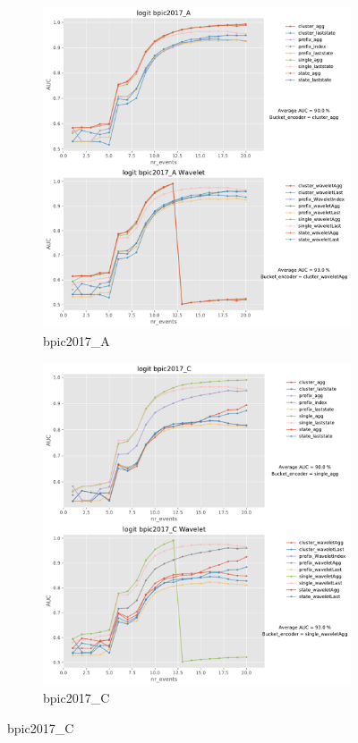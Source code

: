 \documentclass[twoside,11pt]{Latex/Classes/PhDthesisPSnPDF}
\begin{document}
\begin{figure}[!htbp] %
	
	\begin{subfigure}{0.48\textwidth}
		\includegraphics[width=\linewidth]{images/wavelet/graphs2logit/bpic2017_A.pdf}
		\caption{bpic2017\_A} 
	\end{subfigure}\hspace*{\fill}
	\begin{subfigure}{0.48\textwidth}
		\includegraphics[width=\linewidth]{images/wavelet/graphs2logit/bpic2017_C.pdf}
		\caption{bpic2017\_C}
	\end{subfigure}
	

\end{figure}
\end{document}
